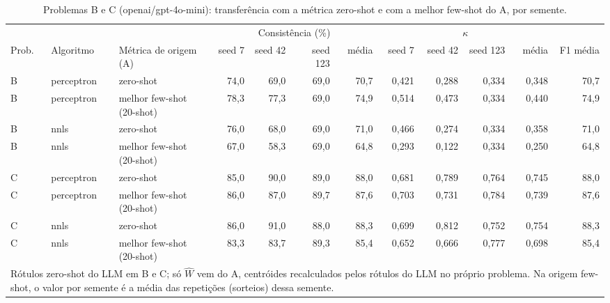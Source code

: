 \begin{table}[htbp]
\centering
\footnotesize
\caption{Problemas B e C (openai/gpt-4o-mini): transferência com a métrica zero-shot e com a melhor few-shot do A, por semente.}
\label{tab:T8_transf_gpt4mini}
\begin{tabular}{lllrrrrrrrrr}
\toprule
 &  &  & \multicolumn{4}{c}{Consistência (\%)} & \multicolumn{4}{c}{$\kappa$} &  \\ \cmidrule(lr){4-7} \cmidrule(lr){8-11}
Prob. & Algoritmo & Métrica de origem (A) & seed 7 & seed 42 & seed 123 & média & seed 7 & seed 42 & seed 123 & média & F1 média \\
\midrule
B & perceptron & zero-shot & 74,0 & 69,0 & 69,0 & 70,7 & 0,421 & 0,288 & 0,334 & 0,348 & 70,7 \\
B & perceptron & melhor few-shot (20-shot) & 78,3 & 77,3 & 69,0 & 74,9 & 0,514 & 0,473 & 0,334 & 0,440 & 74,9 \\
B & nnls & zero-shot & 76,0 & 68,0 & 69,0 & 71,0 & 0,466 & 0,274 & 0,334 & 0,358 & 71,0 \\
B & nnls & melhor few-shot (20-shot) & 67,0 & 58,3 & 69,0 & 64,8 & 0,293 & 0,122 & 0,334 & 0,250 & 64,8 \\
\midrule
C & perceptron & zero-shot & 85,0 & 90,0 & 89,0 & 88,0 & 0,681 & 0,789 & 0,764 & 0,745 & 88,0 \\
C & perceptron & melhor few-shot (20-shot) & 86,0 & 87,0 & 89,7 & 87,6 & 0,703 & 0,731 & 0,784 & 0,739 & 87,6 \\
C & nnls & zero-shot & 86,0 & 91,0 & 88,0 & 88,3 & 0,699 & 0,812 & 0,752 & 0,754 & 88,3 \\
C & nnls & melhor few-shot (20-shot) & 83,3 & 83,7 & 89,3 & 85,4 & 0,652 & 0,666 & 0,777 & 0,698 & 85,4 \\
\bottomrule
\multicolumn{12}{p{0.95\linewidth}}{\footnotesize Rótulos zero-shot do LLM em B e C; só $\hat{W}$ vem do A, centróides recalculados pelos rótulos do LLM no próprio problema. Na origem few-shot, o valor por semente é a média das repetições (sorteios) dessa semente.} \\
\end{tabular}
\end{table}
